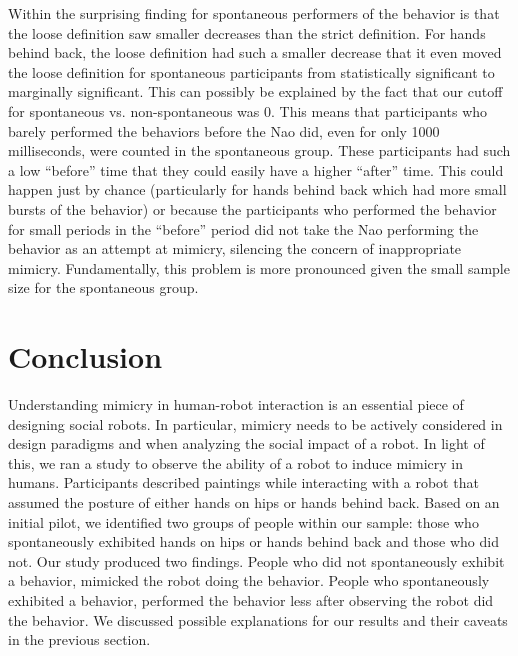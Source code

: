 \documentclass{acm_proc_article-sp}
\begin{document}
Within the surprising finding for spontaneous performers of the behavior is that the loose definition saw smaller decreases than the strict definition. For hands behind back, the loose definition had such a smaller decrease that it even moved the loose definition for spontaneous participants from statistically significant to marginally significant. This can possibly be explained by the fact that our cutoff for spontaneous vs. non-spontaneous was 0. This means that participants who barely performed the behaviors before the Nao did, even for only 1000 milliseconds, were counted in the spontaneous group. These participants had such a low ``before'' time that they could easily have a higher ``after'' time. This could happen just by chance (particularly for hands behind back which had more small bursts of the behavior) or because the participants who performed the behavior for small periods in the ``before'' period did not take the Nao performing the behavior as an attempt at mimicry, silencing the concern of inappropriate mimicry. Fundamentally, this problem is more pronounced given the small sample size for the spontaneous group.

\section{Conclusion}
Understanding mimicry in human-robot interaction is an essential piece of designing social robots. In particular, mimicry needs to be actively considered in design paradigms and when analyzing the social impact of a robot. In light of this, we ran a study to observe the ability of a robot to induce mimicry in humans. Participants described paintings while interacting with a robot that assumed the posture of either hands on hips or hands behind back. Based on an initial pilot, we identified two groups of people within our sample: those who spontaneously exhibited hands on hips or hands behind back and those who did not. Our study produced two findings. People who did not spontaneously exhibit a behavior, mimicked the robot doing the behavior. People who spontaneously exhibited a behavior, performed the behavior less after observing the robot did the behavior. We discussed possible explanations for our results and their caveats in the previous section.
\end{document}
